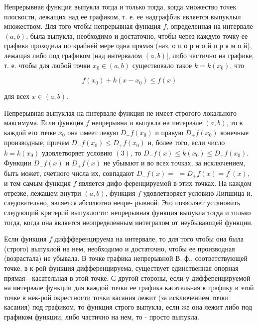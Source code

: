 \documentclass[10pt]{article}
\begin{document}
Непрерывная функция выпукла тогда и только тогда, когда множество точек плоскости, лежащих над ее графиком, т. е. ее надграфбик является выпуклыл множеством. Для того чтобы непрерывная функция $f$, определенная на интервале $(a, b)$, была выпукла, необходимо и достаточно, чтобы через каждую точку ее графика проходила по крайней мере одна прямая (наз. о п о р н о й п р я м о й), лежащая либо под графиком [над интервалом $(a, b)]$, либо частично на графике, т. е. чтобы для любой точки $x_{0} \in(a, b)$ существовало такое $k=k\left(x_{0}\right)$, что



\[

f\left(x_{0}\right)+k\left(x-x_{0}\right) \leqslant f(x)

\]



для всех $x \in(a, b)$.



Непрерывная выпуклая на пнтервале функция не имеет строгого локального максимума. Если функция $f$ непрерывна и выпукла на интервале $(a, b)$, то в каждой его точке $x_{0}$ она имеет левую $D_{-} f\left(x_{0}\right)$ и правую $D_{+} f\left(x_{0}\right)$ конечные производные, причем $D_{-} f\left(x_{0}\right) \leqslant D_{+} f\left(x_{0}\right)$ и, более того, если число $k=k\left(x_{0}\right)$ удовлетворяет условию $(3)$, то $D_{-} f(x) \leqslant k\left(x_{0}\right) \leqslant D_{+} f\left(x_{0}\right)$. Функции $D_{-} f(x)$ и $D_{+} f(x)$ не убывают и во всех точках, за исключением, быть может, счетного чнсла их, совпадают $D_{-} f(x)=$ $=D_{+} f(x)=f^{\prime}(x)$, и тем самым функция $f$ является дифо ференцируемой в этих точках. На каждом отрезке, лежащем внутри $(a, b)$, функция $f$ удовлетворяет условию Липшица и, следовательно, является абсолютно непре- рывной. Это позволяет установить следующий критерий выпуклости: непрерывная функция выпукла тогда и только тогда, когда она является неопределенным интегралом от неубывающей функции.



Если функция $f$ диффференцируема на интервале, то для того чтобы она была (строго) выпуклой на нем, необходимо и достаточно, чтобы ее производная (возрастала) не убывала. В точке графика непрерывной В. ф., соответствующей точке, в к-рой функция дифференцируема, существует единственная опорная прямая - касательная в этой точке. С другой стороны, если у дифференцируемой на интервале функции для каждой точки ее графика касательная к графику в этой точке в нек-рой окрестности точки касания лежит (за исключением точки касания) под графиком, то функция строго выпукла, если же она лежит либо под графиком функции, либо частично на нем, то - просто выпукла.
\end{document}
